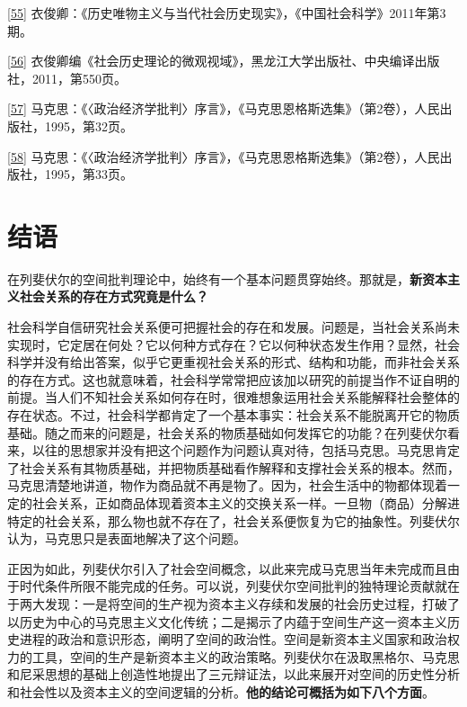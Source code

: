 \documentclass[UTF8, fontset = sourcesans, a4paper, oneside, zihao =
-4, scheme=chinese, no-math, space=true]{ctexbook}
\begin{document}
\protect\hypertarget{part0010_split_002.htmlux5cux23m55}{}{}\protect\hyperlink{part0010_split_002.htmlux5cux23w55}{{[}55{]}}
衣俊卿：《历史唯物主义与当代社会历史现实》，《中国社会科学》2011年第3期。

\protect\hypertarget{part0010_split_002.htmlux5cux23m56}{}{}\protect\hyperlink{part0010_split_002.htmlux5cux23w56}{{[}56{]}}
衣俊卿编《社会历史理论的微观视域》，黑龙江大学出版社、中央编译出版社，2011，第550页。

\protect\hypertarget{part0010_split_002.htmlux5cux23m57}{}{}\protect\hyperlink{part0010_split_002.htmlux5cux23w57}{{[}57{]}}
马克思：《〈政治经济学批判〉序言》，《马克思恩格斯选集》（第2卷），人民出版社，1995，第32页。

\protect\hypertarget{part0010_split_002.htmlux5cux23m58}{}{}\protect\hyperlink{part0010_split_002.htmlux5cux23w58}{{[}58{]}}
马克思：《〈政治经济学批判〉序言》，《马克思恩格斯选集》（第2卷），人民出版社，1995，第33页。

\protect\hypertarget{part0011.html}{}{}

\hypertarget{part0011.htmlux5cux23a011}{\chapter{结语}\label{part0011.htmlux5cux23a011}}

在列斐伏尔的空间批判理论中，始终有一个基本问题贯穿始终。那就是，\textbf{新资本主义社会关系的存在方式究竟是什么？}

社会科学自信研究社会关系便可把握社会的存在和发展。问题是，当社会关系尚未实现时，它定居在何处？它以何种方式存在？它以何种状态发生作用？显然，社会科学并没有给出答案，似乎它更重视社会关系的形式、结构和功能，而非社会关系的存在方式。这也就意味着，社会科学常常把应该加以研究的前提当作不证自明的前提。当人们不知社会关系如何存在时，很难想象运用社会关系能解释社会整体的存在状态。不过，社会科学都肯定了一个基本事实：社会关系不能脱离开它的物质基础。随之而来的问题是，社会关系的物质基础如何发挥它的功能？在列斐伏尔看来，以往的思想家并没有把这个问题作为问题认真对待，包括马克思。马克思肯定了社会关系有其物质基础，并把物质基础看作解释和支撑社会关系的根本。然而，马克思清楚地讲道，物作为商品就不再是物了。因为，社会生活中的物都体现着一定的社会关系，正如商品体现着资本主义的交换关系一样。一旦物（商品）分解进特定的社会关系，那么物也就不存在了，社会关系便恢复为它的抽象性。列斐伏尔认为，马克思只是表面地解决了这个问题。

正因为如此，列斐伏尔引入了社会空间概念，以此来完成马克思当年未完成而且由于时代条件所限不能完成的任务。可以说，列斐伏尔空间批判的独特理论贡献就在于两大发现：一是将空间的生产视为资本主义存续和发展的社会历史过程，打破了以历史为中心的马克思主义文化传统；二是揭示了内蕴于空间生产这一资本主义历史进程的政治和意识形态，阐明了空间的政治性。空间是新资本主义国家和政治权力的工具，空间的生产是新资本主义的政治策略。列斐伏尔在汲取黑格尔、马克思和尼采思想的基础上创造性地提出了三元辩证法，以此来展开对空间的历史性分析和社会性以及资本主义的空间逻辑的分析。\textbf{他的结论可概括为如下八个方面}。
\end{document}
